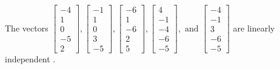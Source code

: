 \begin{exercise}
\begin{exerciseStatement}
  \end{exerciseStatement}
  \begin{exerciseAnswer}
   The vectors \(\left[\begin{array}{r}
-4 \\
1 \\
0 \\
-5 \\
2
\end{array}\right] , \left[\begin{array}{r}
-1 \\
1 \\
0 \\
3 \\
-5
\end{array}\right] , \left[\begin{array}{r}
-6 \\
1 \\
-6 \\
2 \\
5
\end{array}\right] , \left[\begin{array}{r}
4 \\
-1 \\
-4 \\
-6 \\
-5
\end{array}\right] , \text{ and } \left[\begin{array}{r}
-4 \\
-1 \\
3 \\
-6 \\
-5
\end{array}\right]\) are 
  	 linearly independent  .
  


  \end{exerciseAnswer}
\end{exercise}